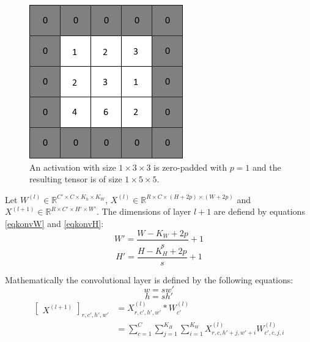 \documentclass[a4paper, twoside]{article}
\begin{document}
\begin{figure}[h]
	\centering
  		\includegraphics[scale=0.7]{zeropadding.png}
  	\caption{An activation with size $1 \times 3 \times 3$ is zero-padded with $p=1$ and the resulting tensor is of size $1 \times 5 \times 5$.} \label{figzeropad}
\end{figure}

Let $W^{(l)} \in \mathbb{R}^{C' \times C  \times K_h \times K_W}$, $X^{(l)} \in \mathbb{R}^{R \times C  \times (H+2p) \times (W+2p)}$ and $X^{(l+1)} \in \mathbb{R}^{R \times C'  \times H' \times W'}$. The dimensions of layer $l+1$ are defiend by equations \eqref{eqkonvW} and \eqref{eqkonvH}: \cite{cs231n} \cite{convmath} \cite{convarithmetic}
\begin{equation}\label{eqkonvW}
W' = \frac{W-K_W+2p}{s} +1
\end{equation}
\begin{equation}\label{eqkonvH}
H' = \frac{H-K_H+2p}{s} +1
\end{equation}

Mathematically the convolutional layer is defined by the following equations: \cite{cs231n} \cite{convmath}
\begin{equation}
w = sw'
\end{equation}
\begin{equation}
h = sh'
\end{equation}
\begin{equation}\label{konvolution}
\begin{split}
	\begin{bmatrix} X^{(l+1)} \end{bmatrix}_{r, c', h', w'}	
		& = X^{(l)}_{r, c', h', w'} *W^{(l)}_{c'} \\
		& = \sum^{C}_{c=1} \sum^{K_H}_{j=1} \sum^{K_W}_{i=1} X^{(l)}_{r, c, h'+j, w'+i}W^{(l)}_{c', c, j, i}
\end{split}
\end{equation}
\end{document}
